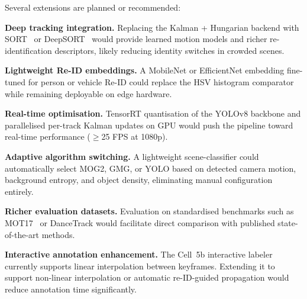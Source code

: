 \documentclass[10pt, conference, compsocconf]{IEEEtran}
\begin{document}
Several extensions are planned or recommended:

\textbf{Deep tracking integration.} Replacing the Kalman + Hungarian
backend with SORT~\cite{bewley2016} or DeepSORT~\cite{wojke2017}
would provide learned motion models and richer re-identification
descriptors, likely reducing identity switches in crowded scenes.

\textbf{Lightweight Re-ID embeddings.} A MobileNet or EfficientNet
embedding fine-tuned for person or vehicle Re-ID could replace the
HSV histogram comparator while remaining deployable on edge hardware.

\textbf{Real-time optimisation.} TensorRT quantisation of the YOLOv8
backbone and parallelised per-track Kalman updates on GPU would push
the pipeline toward real-time performance
($\geq$25 FPS at 1080p).

\textbf{Adaptive algorithm switching.} A lightweight scene-classifier
could automatically select MOG2, GMG, or YOLO based on detected
camera motion, background entropy, and object density, eliminating
manual configuration entirely.

\textbf{Richer evaluation datasets.} Evaluation on standardised
benchmarks such as MOT17~\cite{milan2016} or DanceTrack would
facilitate direct comparison with published state-of-the-art methods.

\textbf{Interactive annotation enhancement.} The Cell~5b interactive
labeler currently supports linear interpolation between keyframes.
Extending it to support non-linear interpolation or automatic
re-ID-guided propagation would reduce annotation time significantly.
\end{document}
